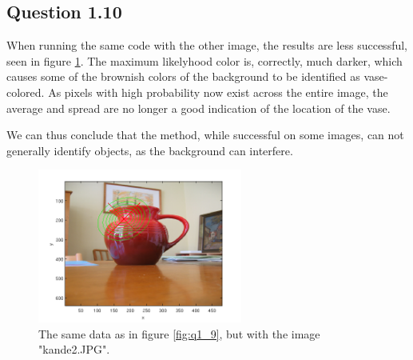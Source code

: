 \documentclass[a4paper, 10pt, final]{article}
\begin{document}
\subsection*{Question 1.10}

When running the same code with the other image, the results are less successful, seen in figure \ref{fig:q1_10}.
The maximum likelyhood color is, correctly, much darker, which causes some of the brownish colors of the background to be identified as vase-colored.
As pixels with high probability now exist across the entire image, the average and spread are no longer a good indication of the location of the vase.

We can thus conclude that the method, while successful on some images, can not generally identify objects, as the background can interfere.

\begin{figure}[!htpb]
  \centering
  \includegraphics[width=0.6\textwidth]{images/kande2.png}
  \caption{The same data as in figure \ref{fig:q1_9}, but with the image "kande2.JPG".}
  \label{fig:q1_10}
\end{figure}


%
%
\end{document}
